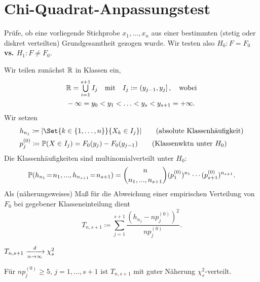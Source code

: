 \documentclass{cheat-sheet}
\renewcommand{\P}{\mathbb{P}} %
\newcommand{\testh}[1]{\textcolor{TestColor}{\textbf{#1}}}
\begin{document}

\section{Chi-Quadrat-Anpassungstest}


\begin{aufgabe}
  Prüfe, ob eine vorliegende Stichprobe $x_1, \ldots, x_n$ aus einer bestimmten (stetig oder diskret verteilten) Grundgesamtheit gezogen wurde. Wir testen also \testh{$H_0 : F = F_0$ vs. $H_1 : F \neq F_0$}.
\end{aufgabe}


\begin{verf}
  Wir teilen zunächst $\mathbb{R}$ in Klassen ein,
  \begin{align*}
    & \R = \bigcup_{i=1}^{s+1} I_j
    \quad \text{mit} \quad
    I_j \coloneqq \ocinterval{y_{j-1}}{y_j},
    \quad
    \text{wobei} \\
    & - \infty = y_0 < y_1 < \ldots < y_s < y_{s+1} = + \infty.
  \end{align*}
  Wir setzen
  \begin{align*}
    & h_{n_j} \coloneqq \abs{\Set{k \in \{ 1, \ldots, n \}}{X_k \in I_j}} \tag{absolute Klassenhäufigkeit} \\
    & p_j^{(0)} \coloneqq \P(X \in I_j) = F_0(y_j) - F_0(y_{j-1}) \tag{Klassenwktn unter $H_0$}
  \end{align*}
  Die Klassenhäufigkeiten sind multinomialverteilt unter $H_0$:
  \[ \P(h_{n_1} \!=\! n_1, \nldots, h_{n_{s+1}} \!=\! n_{s+1}) = \binom{n}{n_1, \nldots, n_{s+1}} (p_1^{(0)})^{n_1} \cdots (p_{s+1}^{(0)})^{n_{s+1}}. \]
  Als (näherungsweises) Maß für die Abweichung einer empirischen Verteilung von $F_0$ bei gegebener Klasseneinteilung dient
  \[ T_{n,s+1} \coloneqq \sum_{j=1}^{s+1} \frac{(h_{n_j} - n p_j^{(0)})^2}{n p_j^{(0)}}. \]
\end{verf}

\begin{satz}
  $T_{n,s+1} \xrightarrow[n \to \infty]{d} \chi_s^2$
\end{satz}

\begin{faustregel}
  Für $n p_j^{(0)} \geq 5$, $j = 1, \ldots, s+1$ ist $T_{n,s+1}$ mit guter Näherung $\chi_s^2$-verteilt.
\end{faustregel}
\end{document}
